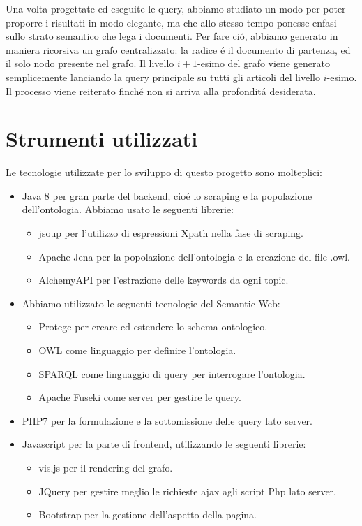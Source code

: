 \documentclass[11pt,a4paper]{article}
\begin{document}
Una volta progettate ed eseguite le query, abbiamo studiato un modo per poter proporre i risultati in modo elegante, ma che allo stesso tempo ponesse enfasi sullo strato semantico che lega i documenti. Per fare ci\'o, abbiamo generato in maniera ricorsiva un grafo centralizzato: la radice \'e il documento di partenza, ed il solo nodo presente nel grafo. Il livello $i+1$-esimo del grafo viene generato semplicemente lanciando la query principale su tutti gli articoli del livello $i$-esimo. Il processo viene reiterato finch\'e non si arriva alla profondit\'a desiderata.

\section{Strumenti utilizzati}
\label{sec:tools}
Le tecnologie utilizzate per lo sviluppo di questo progetto sono molteplici:
\begin{itemize}
	\item Java 8 per gran parte del backend, cio\'e lo scraping e la popolazione dell'ontologia. Abbiamo usato le seguenti librerie:
	\begin{itemize}
		\item jsoup per l'utilizzo di espressioni Xpath nella fase di scraping.
		\item Apache Jena per la popolazione dell'ontologia e la creazione del file .owl.
		\item AlchemyAPI per l'estrazione delle keywords da ogni topic.
	\end{itemize}
	\item Abbiamo utilizzato le seguenti tecnologie del Semantic Web:
	\begin{itemize}
		\item Protege per creare ed estendere lo schema ontologico.
		\item OWL come linguaggio per definire l'ontologia.
		\item SPARQL come linguaggio di query per interrogare l'ontologia.
		\item Apache Fuseki come server per gestire le query.
	\end{itemize}
	\item PHP7 per la formulazione e la sottomissione delle query lato server.
	\item Javascript per la parte di frontend, utilizzando le seguenti librerie:
	\begin{itemize}
		\item vis.js per il rendering del grafo.
		\item JQuery per gestire meglio le richieste ajax agli script Php lato server.
		\item Bootstrap per la gestione dell'aspetto della pagina.
	\end{itemize}
\end{itemize}
\end{document}

